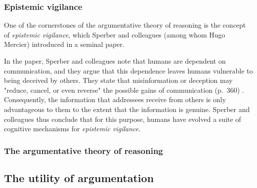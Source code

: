 \subsubsection{Epistemic vigilance}

One of the cornerstones of the argumentative theory of reasoning is the concept of \emph{epistemic vigilance}, which Sperber and colleagues (among whom Hugo Mercier) introduced in a seminal \citeyear{Sperber10} paper.

In the paper, Sperber and colleagues note that humans are dependent on communication, and they argue that this dependence leaves humans vulnerable to being deceived by others.
They state that misinformation or deception may "reduce, cancel, or even reverse" the possible gains of communication (p.~360) .
Consequently, the information that addressees receive from others is only advantageous to them to the extent that the information is genuine.
Sperber and colleagues thus conclude that for this purpose, humans have evolved a suite of cognitive mechanisms for \emph{epistemic vigilance}.

\subsubsection{The argumentative theory of reasoning}

\subsection{The utility of argumentation}
